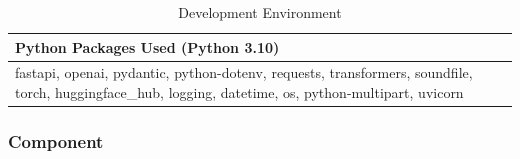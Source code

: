        
        \begin{table}[h!]
            \centering
            \caption{Development Environment}
            \begin{tabular}{|p{7.4cm}|}
                \hline
                \textbf{Python Packages Used (Python 3.10)} \\ 
                \hline
                fastapi, openai, pydantic, python-dotenv, requests, transformers, soundfile, torch, huggingface\_hub, logging, datetime, os, python-multipart, uvicorn \\ 
                \hline
            \end{tabular}
        \end{table}

            
            \subsubsection{Component}
